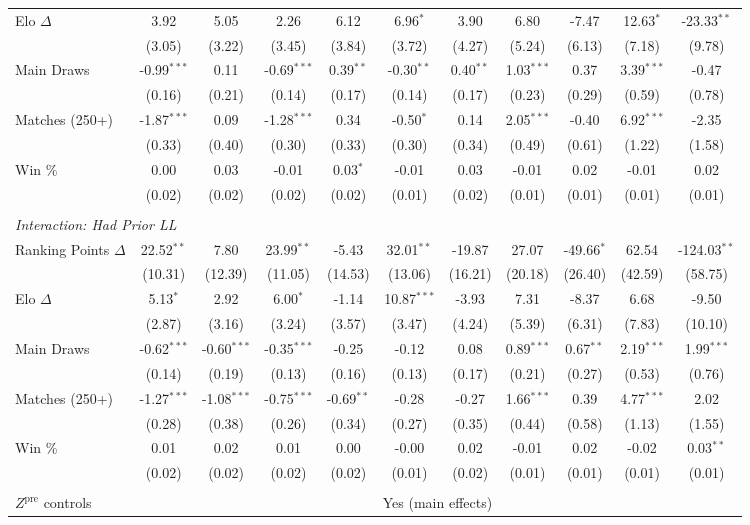 \begin{tabular}{lcccccccccc}
\quad Elo $\Delta$ & 3.92 & 5.05 & 2.26 & 6.12 & 6.96$^{*}$ & 3.90 & 6.80 & -7.47 & 12.63$^{*}$ & -23.33$^{**}$ \\
 & (3.05) & (3.22) & (3.45) & (3.84) & (3.72) & (4.27) & (5.24) & (6.13) & (7.18) & (9.78) \\[0.3em]
\quad Main Draws & -0.99$^{***}$ & 0.11 & -0.69$^{***}$ & 0.39$^{**}$ & -0.30$^{**}$ & 0.40$^{**}$ & 1.03$^{***}$ & 0.37 & 3.39$^{***}$ & -0.47 \\
 & (0.16) & (0.21) & (0.14) & (0.17) & (0.14) & (0.17) & (0.23) & (0.29) & (0.59) & (0.78) \\[0.3em]
\quad Matches (250+) & -1.87$^{***}$ & 0.09 & -1.28$^{***}$ & 0.34 & -0.50$^{*}$ & 0.14 & 2.05$^{***}$ & -0.40 & 6.92$^{***}$ & -2.35 \\
 & (0.33) & (0.40) & (0.30) & (0.33) & (0.30) & (0.34) & (0.49) & (0.61) & (1.22) & (1.58) \\[0.3em]
\quad Win \% & 0.00 & 0.03 & -0.01 & 0.03$^{*}$ & -0.01 & 0.03 & -0.01 & 0.02 & -0.01 & 0.02 \\
 & (0.02) & (0.02) & (0.02) & (0.02) & (0.01) & (0.02) & (0.01) & (0.01) & (0.01) & (0.01) \\[0.3em]
\\[0.3em]
\multicolumn{11}{l}{\textit{Interaction: Had Prior LL}} \\
\quad Ranking Points $\Delta$ & 22.52$^{**}$ & 7.80 & 23.99$^{**}$ & -5.43 & 32.01$^{**}$ & -19.87 & 27.07 & -49.66$^{*}$ & 62.54 & -124.03$^{**}$ \\
 & (10.31) & (12.39) & (11.05) & (14.53) & (13.06) & (16.21) & (20.18) & (26.40) & (42.59) & (58.75) \\[0.3em]
\quad Elo $\Delta$ & 5.13$^{*}$ & 2.92 & 6.00$^{*}$ & -1.14 & 10.87$^{***}$ & -3.93 & 7.31 & -8.37 & 6.68 & -9.50 \\
 & (2.87) & (3.16) & (3.24) & (3.57) & (3.47) & (4.24) & (5.39) & (6.31) & (7.83) & (10.10) \\[0.3em]
\quad Main Draws & -0.62$^{***}$ & -0.60$^{***}$ & -0.35$^{***}$ & -0.25 & -0.12 & 0.08 & 0.89$^{***}$ & 0.67$^{**}$ & 2.19$^{***}$ & 1.99$^{***}$ \\
 & (0.14) & (0.19) & (0.13) & (0.16) & (0.13) & (0.17) & (0.21) & (0.27) & (0.53) & (0.76) \\[0.3em]
\quad Matches (250+) & -1.27$^{***}$ & -1.08$^{***}$ & -0.75$^{***}$ & -0.69$^{**}$ & -0.28 & -0.27 & 1.66$^{***}$ & 0.39 & 4.77$^{***}$ & 2.02 \\
 & (0.28) & (0.38) & (0.26) & (0.34) & (0.27) & (0.35) & (0.44) & (0.58) & (1.13) & (1.55) \\[0.3em]
\quad Win \% & 0.01 & 0.02 & 0.01 & 0.00 & -0.00 & 0.02 & -0.01 & 0.02 & -0.02 & 0.03$^{**}$ \\
 & (0.02) & (0.02) & (0.02) & (0.02) & (0.01) & (0.02) & (0.01) & (0.01) & (0.01) & (0.01) \\[0.3em]
\\[0.3em]
\midrule
$Z^{\text{pre}}$ controls & \multicolumn{10}{c}{Yes (main effects)} \\
\bottomrule
\end{tabular}
